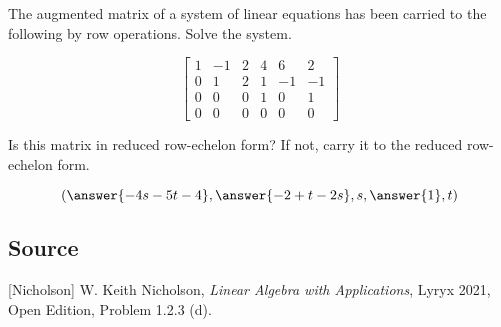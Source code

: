 \documentclass{ximera}
\author{}
\begin{document}
\begin{exercise}
The augmented matrix of a system of linear equations has been carried to the following by row operations.  Solve the system.

$$\left[\begin{array}{ccccc|c} 
 1 & -1 & 2 & 4 & 6 & 2\\
0 & 1 & 2 & 1 & -1 & -1\\
 0 & 0 & 0 & 1 & 0 & 1\\
 0 & 0 & 0 & 0 & 0 & 0
 \end{array}\right]$$

 \begin{hint}
     Is this matrix in reduced row-echelon form?  If not, carry it to the reduced row-echelon form.
 \end{hint}

 $$(\answer{-4s-5t-4}, \answer{-2+t-2s}, s,\answer{1}, t)$$
 
\end{exercise}

\subsection*{Source}
[Nicholson] W. Keith Nicholson, {\it Linear Algebra with Applications}, Lyryx 2021, Open Edition, Problem 1.2.3 (d).
\end{document}
